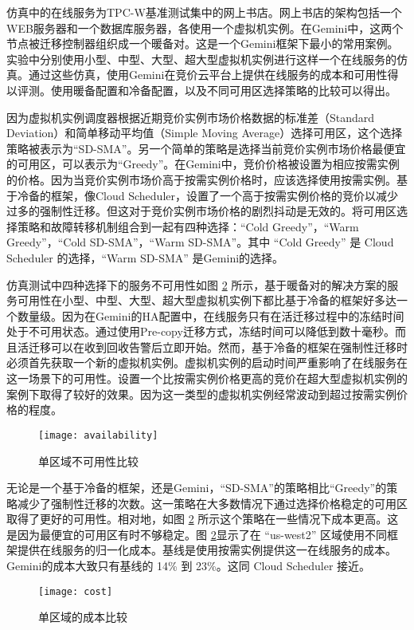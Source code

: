 仿真中的在线服务为TPC-W基准测试集中的网上书店。网上书店的架构包括一个WEB服务器和一个数据库服务器，各使用一个虚拟机实例。在Gemini中，这两个节点被迁移控制器组织成一个暖备对。这是一个Gemini框架下最小的常用案例。实验中分别使用小型、中型、大型、超大型虚拟机实例进行这样一个在线服务的仿真。通过这些仿真，使用Gemini在竞价云平台上提供在线服务的成本和可用性得以评测。使用暖备配置和冷备配置，以及不同可用区选择策略的比较可以得出。

因为虚拟机实例调度器根据近期竞价实例市场价格数据的标准差（Standard Deviation）和简单移动平均值（Simple Moving Average）选择可用区，这个选择策略被表示为``SD-SMA''。另一个简单的策略是选择当前竞价实例市场价格最便宜的可用区，可以表示为``Greedy''。在Gemini中，竞价价格被设置为相应按需实例的价格。因为当竞价实例市场价高于按需实例价格时，应该选择使用按需实例。基于冷备的框架，像Cloud Scheduler，设置了一个高于按需实例价格的竞价以减少过多的强制性迁移。但这对于竞价实例市场价格的剧烈抖动是无效的。将可用区选择策略和故障转移机制组合到一起有四种选择：``Cold Greedy''，``Warm Greedy''，``Cold SD-SMA''，``Warm SD-SMA''。其中 ``Cold Greedy'' 是 Cloud Scheduler 的选择，``Warm SD-SMA'' 是Gemini的选择。

仿真测试中四种选择下的服务不可用性如图 \ref{figure:cost} 所示，基于暖备对的解决方案的服务可用性在小型、中型、大型、超大型虚拟机实例下都比基于冷备的框架好多达一个数量级。因为在Gemini的HA配置中，在线服务只有在活迁移过程中的冻结时间处于不可用状态。通过使用Pre-copy迁移方式，冻结时间可以降低到数十毫秒。而且活迁移可以在收到回收告警后立即开始。然而，基于冷备的框架在强制性迁移时必须首先获取一个新的虚拟机实例。虚拟机实例的启动时间严重影响了在线服务在这一场景下的可用性。设置一个比按需实例价格更高的竞价在超大型虚拟机实例的案例下取得了较好的效果。因为这一类型的虚拟机实例经常波动到超过按需实例价格的程度。
\begin{figure}[]
  \centering
  \texttt{[image: availability]}
  \caption{单区域不可用性比较}
  \label{figure:unavailability}
\end{figure}

无论是一个基于冷备的框架，还是Gemini，``SD-SMA''的策略相比``Greedy''的策略减少了强制性迁移的次数。这一策略在大多数情况下通过选择价格稳定的可用区取得了更好的可用性。相对地，如图 \ref{figure:cost} 所示这个策略在一些情况下成本更高。这是因为最便宜的可用区有时不够稳定。图 \ref{figure:cost}显示了在 ``us-west2'' 区域使用不同框架提供在线服务的归一化成本。基线是使用按需实例提供这一在线服务的成本。Gemini的成本大致只有基线的 14\% 到 23\%。这同 Cloud Scheduler 接近。
\begin{figure}[]
  \centering
  \texttt{[image: cost]}
  \caption{单区域的成本比较}
  \label{figure:cost}
\end{figure}

